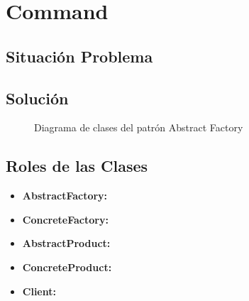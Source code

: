 
\chapter{Command}

\section{Situación Problema}



\section{Solución}


\begin{figure}[H]
    \centering
    \caption{Diagrama de clases del patrón Abstract Factory}
\end{figure}


\section{Roles de las Clases}


\begin{itemize}
    \item \textbf{AbstractFactory:}
    \item \textbf{ConcreteFactory:}
    \item \textbf{AbstractProduct:}
    \item \textbf{ConcreteProduct:}
    \item \textbf{Client:}
\end{itemize}


